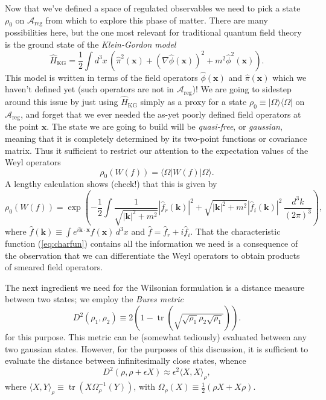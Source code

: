 \documentclass[11pt]{amsart}
\DeclareMathOperator{\tr}{tr}
\theoremstyle{plain}%
\theoremstyle{definition}
\theoremstyle{remark}
\begin{document}
Now that we've defined a space of regulated observables we need to pick a state $\rho_0$ on $\mathcal{A}_{\text{reg}}$ from which to explore this phase of matter. There are many possibilities here, but the one most relevant for traditional quantum field theory is the ground state of the \emph{Klein-Gordon model}
\begin{equation}
	\widehat{H}_{\text{KG}} = \frac12\int d^3 {x}\, \left(\widehat{\pi}^2(\mathbf{x}) + (\nabla \widehat{\phi}(\mathbf{x}))^2 + m^2 \widehat{\phi}^2(\mathbf{x})\right).
\end{equation}
This model is written in terms of the field operators $\widehat{\phi}(\mathbf{x})$ and $\widehat{\pi}(\mathbf{x})$ which we haven't defined yet (such operators are not in $\mathcal{A}_{\text{reg}}$)! We are going to sidestep around this issue by just using $\widehat{H}_{\text{KG}}$ simply as a proxy for a state $\rho_0 \equiv |\Omega\rangle\langle \Omega|$ on $\mathcal{A}_{\text{reg}}$, and forget that we ever needed the as-yet poorly defined field operators at the point $\mathbf{x}$. The state we are going to build will be \emph{quasi-free}, or \emph{gaussian}, meaning that it is completely determined by its two-point functions or covariance matrix. Thus it sufficient to restrict our attention to the expectation values of the Weyl operators 
\begin{equation}\label{eq:charfun}
	\rho_0(W(f)) = \langle \Omega|W(f)|\Omega\rangle.
\end{equation}
A lengthy calculation shows (check!) that this is given by
\begin{equation}
	\rho_0(W(f)) = \exp\left(-\frac{1}{2}\int \frac{1}{\sqrt{|\mathbf{k}|^2 + m^2}}|\widehat{f}_r(\mathbf{k})|^2 + \sqrt{|\mathbf{k}|^2 + m^2}|\widehat{f}_i(\mathbf{k})|^2 \,\frac{d^3k}{(2\pi)^3} \right),
\end{equation}
where $\widehat{f}(\mathbf{k}) \equiv \int e^{i\mathbf{k}\cdot \mathbf{x}} f(\mathbf{x})\, d^3x$ and $\widehat{f} = \widehat{f}_r+ i \widehat{f}_i$. That the characteristic function (\ref{eq:charfun}) contains all the information we need is a consequence of the observation that we can differentiate the Weyl operators to obtain products of smeared field operators.

The next ingredient we need for the Wilsonian formulation is a distance measure between two states; we employ the \emph{Bures metric}
\begin{equation}
	D^2(\rho_1,\rho_2) \equiv 2\left(1-\tr\left(\sqrt{\sqrt{\rho_1}\rho_2\sqrt{\rho_1}}\right)\right).
\end{equation} 
for this purpose. This metric can be (somewhat tediously) evaluated \cite{marian_uhlmann_2012} between any two gaussian states. However, for the purposes of this discussion, it is sufficient to evaluate the distance between infinitesimally close states, whence
\begin{equation}
	D^2(\rho,\rho + \epsilon X) \approx \epsilon^2 \langle X, X\rangle_\rho,
\end{equation}
where $\langle X, Y\rangle_{\rho} \equiv \tr(X\Omega_\rho^{-1}(Y))$, with $\Omega_\rho(X) \equiv \frac12 (\rho X + X \rho)$.
\end{document}
